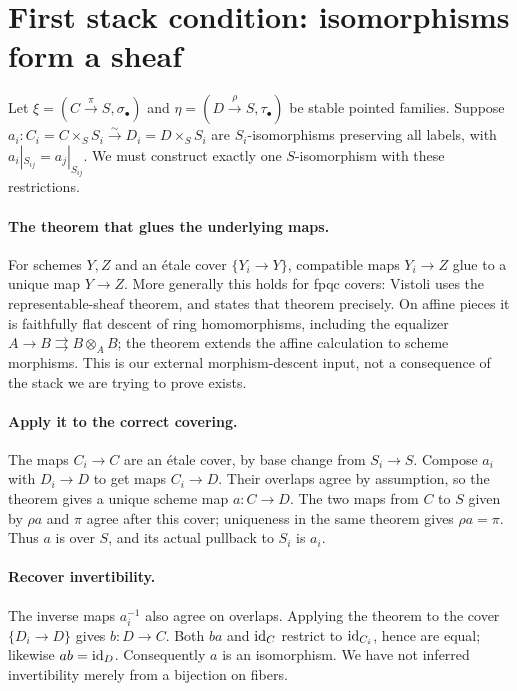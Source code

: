 \section{First stack condition: isomorphisms form a sheaf}\label{sec:curve-isom}

Let $\xi=(C\xrightarrow{\pi}S,\sigma_\bullet)$ and
$\eta=(D\xrightarrow{\rho}S,\tau_\bullet)$ be stable pointed families. Suppose
$a_i:C_i=C\times_SS_i\xrightarrow{\sim}D_i=D\times_SS_i$
are $S_i$-isomorphisms preserving all labels, with
$a_i|_{S_{ij}}=a_j|_{S_{ij}}$. We must construct exactly one
$S$-isomorphism with these restrictions.

\paragraph{The theorem that glues the underlying maps.}
For schemes $Y,Z$ and an \'etale cover $\{Y_i\to Y\}$, compatible
maps $Y_i\to Z$ glue to a unique map $Y\to Z$. More generally this
holds for fpqc covers: Vistoli \cite[Proposition 4.31, pp.~91--92]{Vistoli}
uses the representable-sheaf theorem, and
\cite[Lemma 35.13.7, ]{Stacks} states that theorem
precisely. On affine pieces it is faithfully flat descent of ring
homomorphisms, including the equalizer
$A\to B\rightrightarrows B\otimes_AB$; the theorem extends the
affine calculation to scheme morphisms. This is our external
morphism-descent input, not a consequence of the stack we are
trying to prove exists.

\paragraph{Apply it to the correct covering.}
The maps $C_i\to C$ are an \'etale cover, by base change from
$S_i\to S$. Compose $a_i$ with $D_i\to D$ to get maps
$C_i\to D$. Their overlaps agree by assumption, so the theorem
gives a unique scheme map $a:C\to D$. The two maps from $C$ to
$S$ given by $\rho a$ and $\pi$ agree after this cover; uniqueness
in the same theorem gives $\rho a=\pi$. Thus $a$ is over $S$,
and its actual pullback to $S_i$ is $a_i$.

\paragraph{Recover invertibility.}
The inverse maps $a_i^{-1}$ also agree on overlaps. Applying the
theorem to the cover $\{D_i\to D\}$ gives $b:D\to C$.
Both $ba$ and $\operatorname{id}_C$ restrict to $\operatorname{id}_{C_i}$, hence are equal;
likewise $ab=\operatorname{id}_D$. Consequently $a$ is an isomorphism. We have
not inferred invertibility merely from a bijection on fibers.

